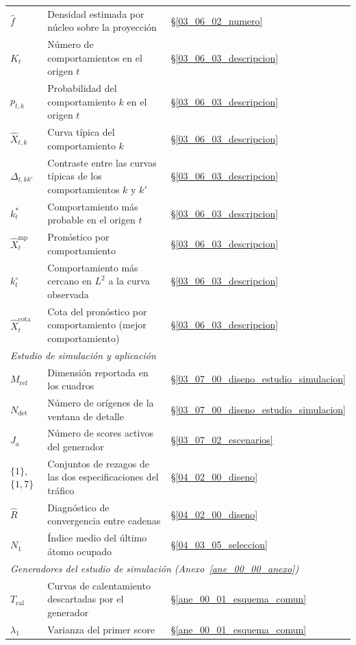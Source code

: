 \begin{longtable}{p{} p{} p{}}
$\widehat{f}$ & Densidad estimada por núcleo sobre la proyección & \S\ref{03_06_02_numero} \\
$K_t$ & Número de comportamientos en el origen $t$ & \S\ref{03_06_03_descripcion} \\
$p_{t,k}$ & Probabilidad del comportamiento $k$ en el origen $t$ & \S\ref{03_06_03_descripcion} \\
$\widehat{X}_{t,k}$ & Curva típica del comportamiento $k$ & \S\ref{03_06_03_descripcion} \\
$\Delta_{t,kk'}$ & Contraste entre las curvas típicas de los comportamientos $k$ y $k'$ & \S\ref{03_06_03_descripcion} \\
$k_t^{*}$ & Comportamiento más probable en el origen $t$ & \S\ref{03_06_03_descripcion} \\
$\widehat{X}_t^{\mathrm{mp}}$ & Pronóstico por comportamiento & \S\ref{03_06_03_descripcion} \\
$k_t^{\circ}$ & Comportamiento más cercano en $L^2$ a la curva observada & \S\ref{03_06_03_descripcion} \\
$\widehat{X}_t^{\mathrm{cota}}$ & Cota del pronóstico por comportamiento (mejor comportamiento) & \S\ref{03_06_03_descripcion} \\
\hline
\multicolumn{3}{l}{\textit{Estudio de simulación y aplicación}} \\
\hline
$M_{\mathrm{ref}}$ & Dimensión reportada en los cuadros & \S\ref{03_07_00_diseno_estudio_simulacion} \\
$N_{\mathrm{det}}$ & Número de orígenes de la ventana de detalle & \S\ref{03_07_00_diseno_estudio_simulacion} \\
$J_a$ & Número de scores activos del generador & \S\ref{03_07_02_escenarios} \\
$\{1\}$, $\{1,7\}$ & Conjuntos de rezagos de las dos especificaciones del tráfico & \S\ref{04_02_00_diseno} \\
$\widehat{R}$ & Diagnóstico de convergencia entre cadenas & \S\ref{04_02_00_diseno} \\
$N_1$ & Índice medio del último átomo ocupado & \S\ref{04_03_05_seleccion} \\
\hline
\multicolumn{3}{l}{\textit{Generadores del estudio de simulación (Anexo~\ref{ane_00_00_anexo})}} \\
\hline
$T_{\mathrm{cal}}$ & Curvas de calentamiento descartadas por el generador & \S\ref{ane_00_01_esquema_comun} \\
$\lambda_1$ & Varianza del primer score & \S\ref{ane_00_01_esquema_comun} \\

\end{longtable}
